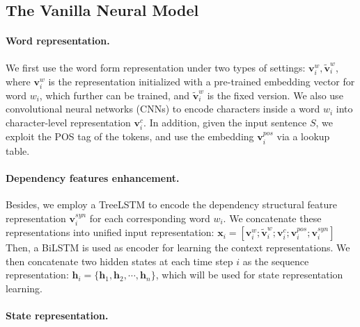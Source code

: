 \documentclass[letterpaper]{article} %
\begin{document}
\begin{CJK}{UTF8}{gbsn}
\subsection{The Vanilla Neural Model}\label{vanilla model}







\paragraph{Word representation.}
We first use the word form representation under two types of settings: $\bm{v}^w_i,\tilde{\bm{v}}^w_i $,
where $\bm{v}^w_i$ is the representation initialized with a pre-trained embedding vector for word $w_i$, which further can be trained, and $\tilde{\bm{v}}^w_i$ is the fixed version.
We also use convolutional neural networks (CNNs) to encode characters inside a word $w_i$ into character-level representation $\bm{v}^{c}_i$.
In addition, given the input sentence $S$, we exploit the POS tag of the tokens, and use the embedding $\bm{v}^{pos}_i$ via a lookup table.


\paragraph{Dependency features enhancement.}
Besides, we employ a TreeLSTM \cite{tai-etal-2015-improved,miwa-bansal-2016-end} to encode the dependency structural feature representation $\bm{v}^{syn}_i$ for each corresponding word $w_i$.
We concatenate these representations into unified input representation: $\bm{x}_i = [\bm{v}^w_i ; \tilde{\bm{v}}^w_i;\bm{v}^{c}_i;\bm{v}^{pos}_i;\bm{v}^{syn}_i ]$
Then, a BiLSTM is used as encoder for learning the context representations.
We then concatenate two hidden states at each time step $i$ as the sequence representation: $\bm{h}_{i}= \{\bm{h}_{1}, \bm{h}_{2}, \cdots , \bm{h}_{n} \}$, which will be used for state representation learning.





\paragraph{State representation.}



\end{CJK}
\end{document}
